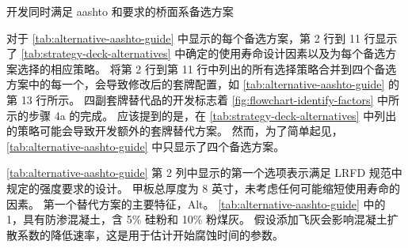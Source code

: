 \begin{table}
  \caption{开发同时满足 \acrshort{aashto} 和要求的桥面系备选方案}\label{tab:alternative-aashto-guide}
\end{table}


对于 \cref{tab:alternative-aashto-guide} 中显示的每个备选方案，第 2 行到 11 行显示了 \cref{tab:strategy-deck-alternatives} 中确定的使用寿命设计因素以及为每个备选方案选择的相应策略。 将第 2 行到第 11 行中列出的所有选择策略合并到四个备选方案中的每一个，会导致修改后的套牌配置，如 \cref{tab:alternative-aashto-guide} 的第 13 行所示。 四副套牌替代品的开发标志着 \cref{fig:flowchart-identify-factors} 中所示的步骤 4a 的完成。 应该提到的是，在 \cref{tab:strategy-deck-alternatives} 中列出的策略可能会导致开发额外的套牌替代方案。 然而，为了简单起见，\cref{tab:alternative-aashto-guide} 中只显示了四个备选方案。


\cref{tab:alternative-aashto-guide} 第 2 列中显示的第一个选项表示满足 LRFD 规范中规定的强度要求的设计。 甲板总厚度为 8 英寸，未考虑任何可能缩短使用寿命的因素。 第一个替代方案的主要特征，Alt。 \cref{tab:alternative-aashto-guide} 中的 1，具有防渗混凝土，含 5\% 硅粉和 10\% 粉煤灰。 假设添加飞灰会影响混凝土扩散系数的降低速率，这是用于估计开始腐蚀时间的参数。

